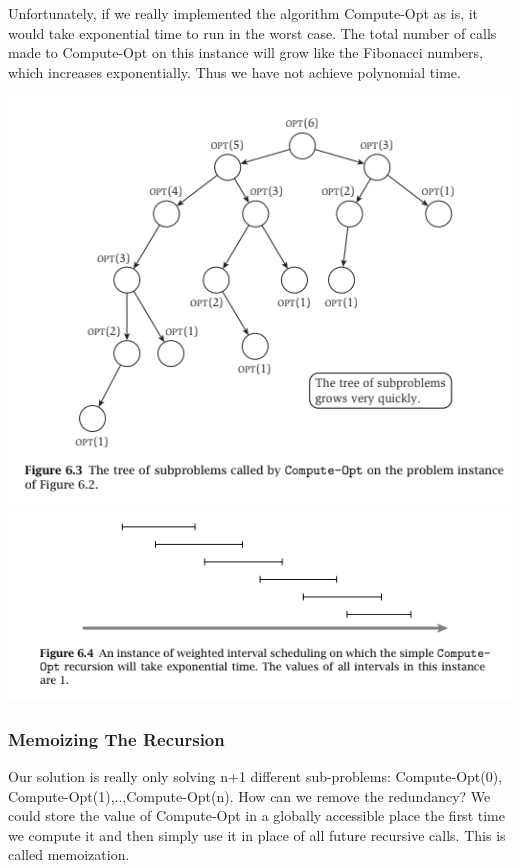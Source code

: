\documentclass{article}
\begin{document}
Unfortunately, if we really implemented the algorithm Compute-Opt as is, it would take exponential time to run in the worst case. The total number of calls made to Compute-Opt on this instance will grow like the Fibonacci numbers, which increases exponentially. Thus we have not achieve polynomial time.\\

\begin{center}
    \includegraphics[]{figures/fig7.png}
    \includegraphics[]{figures/fig8.png}
\end{center}

\subsubsection{Memoizing The Recursion}
Our solution is really only solving n+1 different sub-problems: Compute-Opt(0), Compute-Opt(1),..,Compute-Opt(n). How can we remove the redundancy? We could store the value of Compute-Opt in a globally accessible place the first time we compute it and then simply use it in place of all future recursive calls. This is called memoization.
\end{document}
